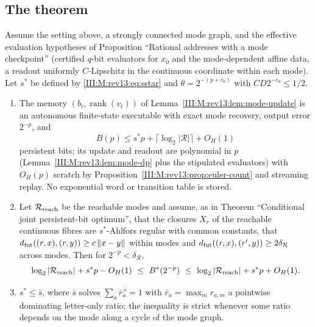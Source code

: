 \subsection{The theorem}
\begin{theorem}\label{III:M:rev13:thm:mode}
Assume the setting above, a strongly connected mode graph, and the effective evaluation
hypotheses of Proposition ``Rational addresses with a mode checkpoint'' (certified
$q$-bit evaluators for $x_0$ and the mode-dependent affine data, a readout uniformly
$C$-Lipschitz in the continuous coordinate within each mode). Let $s^\ast$ be defined by
\eqref{III:M:rev13:eq:sstar} and $\theta=2^{-(p+c_0)}$ with $CD2^{-c_0}\le1/2$.
\begin{enumerate}[label=(\roman*)]
\item The memory $(b_t,\operatorname{rank}(v_t))$ of Lemma~\ref{III:M:rev13:lem:mode-update} is an
autonomous finite-state executable with exact mode recovery, output error $2^{-p}$, and
\[
B(p)\le s^\ast p+\lceil\log_2|\mathcal R|\rceil+O_H(1)
\]
persistent bits; its update and readout are polynomial in $p$ (Lemma~\ref{III:M:rev13:lem:mode-dp}
plus the stipulated evaluators) with $O_H(p)$ scratch by Proposition~\ref{III:M:rev13:prop:euler-count} and streaming replay. No exponential
word or transition table is stored.
\item Let $\mathcal R_{\rm reach}$ be the reachable modes and assume, as in Theorem
``Conditional joint persistent-bit optimum'', that the closures $X_r$ of the reachable
continuous fibres are $s^\ast$-Ahlfors regular with common constants, that
$d_{\rm fut}((r,x),(r,y))\ge c\left\lVert x-y\right\rVert$ within modes and
$d_{\rm fut}((r,x),(r',y))\ge2\delta_{\mathcal R}$ across modes. Then for
$2^{-p}<\delta_{\mathcal R}$,
\[
\log_2|\mathcal R_{\rm reach}|+s^\ast p-O_H(1)\ \le\ B^\ast(2^{-p})\ \le\
\log_2|\mathcal R_{\rm reach}|+s^\ast p+O_H(1).
\]
\item $s^\ast\le\bar s$, where $\bar s$ solves $\sum_a\bar r_a^{\,\bar s}=1$ with
$\bar r_a=\max_mr_{a,m}$ a pointwise dominating letter-only ratio; the inequality is strict whenever some ratio depends on the mode along a cycle of
the mode graph.
\end{enumerate}
\end{theorem}


